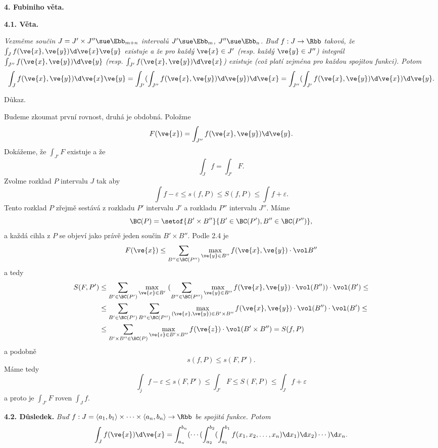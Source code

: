 \documentclass[12pt]{article}
\begin{document}
\vskip10mm
 
  
 {\large\bf 4. Fubiniho věta.}
 
 \bigskip
 
{\bf 4.1. Věta.} {\em Vezměme
 součin $J=J'\times J''\sue\Ebb_{m+n}$
 intervalů $J'\sue\Ebb_m$, $J''\sue\Ebb_n$. Buď   $f:J\to\Rbb$ taková, že
  $\int_Jf(\ve{x},\ve{y})\d\ve{x}\ve{y}$ existuje a že pro každý $\ve{x}\in J'$ 
  (resp. každý $\ve{y}\in J''$) integrál $\int_{J''}f(\ve{x},\ve{y})\d\ve{y}$ (resp.
  $\int_{J'}f(\ve{x},\ve{y})\d\ve{x}$) existuje (což platí zejména pro každou spojitou funkci).
	Potom
 $$
 \int_Jf(\ve{x},\ve{y})\d\ve{x}\ve{y}=\int_{J'}(\int_{J''}f(\ve{x},\ve{y})\d\ve{y})\d\ve{x}=
 \int_{J''}(\int_{J'}f(\ve{x},\ve{y})\d\ve{x})\d\ve{y}.
 $$

 
 Důkaz.} Budeme zkoumat první rovnost, druhá je obdobná.
 Položme
 $$
 F(\ve{x})=\int_{J''}f(\ve{x},\ve{y})\d\ve{y}.
 $$
Dokážeme, že $\int_{J'}F$ existuje a že
$$
 \int_Jf=\int_{J'}F.
 $$
  Zvolme rozklad $P$ intervalu $J$ tak aby
 $$
 \int f-\varepsilon\leq s(f,P)\leq S(f,P)\leq \int f+\varepsilon.
 $$
 Tento rozklad $P$ zřejmě sestává z rozkladu
$P'$ intervalu $J'$ a rozkladu $P''$ intervalu $J''$.  Máme
 $$
 \BC(P)=\setof{B'\times B''}{B'\in \BC(P'), B''\in \BC(P'')},
 $$
 a každá cihla z  $P$ se objeví jako právě jeden součin $B'\times B''$. Podle 2.4 je
 $$
 F(\ve{x})\leq\sum_{B''\in\BC(P'')}\max_{\ve{y}\in B''}f(\ve{x},\ve{y})\cdot\vol B''
 $$
 a tedy
 $$
 \begin{aligned}
 S(F,P')&\leq \sum_{B'\in\BC(P')}\max_{\ve{x}\in B'}\ (\sum_{B''\in \BC(P'')}\max_{\ve{y}\in B''}f(\ve{x},\ve{y})\cdot\vol(B''))\cdot\vol(B')\leq\\
 &\leq \sum_{B'\in\BC(P')}\sum_{B''\in \BC(P'')}\max_{(\ve{x},\ve{y})\in B'\times B''}f(\ve{x},\ve{y})\cdot\vol (B'')\cdot\vol(B')\leq\\
 &\leq \sum_{B'\times B''\in\BC(P)}\max_{\ve{z}\in B'\times B''}f(\ve{z})\cdot\vol(B'\times B'')=
 S(f,P)
 \end{aligned}
 $$
 a podobně
 $$
 s(f,P)\leq s(F,P').
 $$
 Máme tedy
 $$
 \int_jf-\varepsilon\leq s(F,P')\leq{\int}_{J'}F\leq S(F,P)\leq\int_Jf+\varepsilon
 $$
 a proto je $\int_{J'}F$  roven $\int_Jf$. \sq
 
 \bigskip
 
 {\bf 4.2. Důsledek.} {\em Buď $f:J=\langle a_1,b_1\rangle\times\cdots\times\langle a_n,b_n\rangle\to\Rbb$ be spojitá funkce. Potom
 $$ \int_Jf(\ve{x})\d\ve{x}=\int_{a_n}^{b_n}(\cdots(\int_{a_2}^{b_2}(\int_{a_1}^{b_1}f(x_1,x_2,\dots,x_n)\d x_1)\d x_2)\cdots)\d x_n.
 $$}
 
\end{document}
